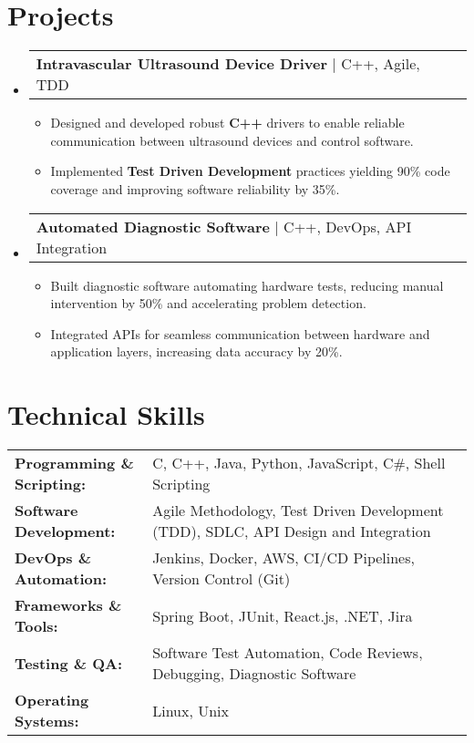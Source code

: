 \documentclass[letterpaper,11pt]{article}
\makeatletter
\newcommand{\resumeItem}[1]{
  \item\footnotesize{
    {#1 \vspace{-2pt}}
  }
}
\newcommand{\resumeProjectHeading}[2]{
    \item
    \begin{tabular*}{1.001\textwidth}{l@{\extracolsep{\fill}}r}
      \small#1 & \textbf{\small #2}\\
    \end{tabular*}\vspace{-7pt}
}
\newcommand{\resumeSubHeadingListStart}{\begin{itemize}[leftmargin=0pt, label={}]}
\newcommand{\resumeSubHeadingListEnd}{\end{itemize}}
\newcommand{\resumeItemListStart}{\begin{itemize}[leftmargin=*]}
\newcommand{\resumeItemListEnd}{\end{itemize}\vspace{-5pt}}
\makeatother
\begin{document}
\section{Projects}
    \vspace{-5pt}
    \resumeSubHeadingListStart
      \resumeProjectHeading
          {\textbf{Intravascular Ultrasound Device Driver} | C++, Agile, TDD}{}
          \resumeItemListStart
              \resumeItem{Designed and developed robust \textbf{C++} drivers to enable reliable communication between ultrasound devices and control software.}
              \resumeItem{Implemented \textbf{Test Driven Development} practices yielding 90\% code coverage and improving software reliability by 35\%.}
          \resumeItemListEnd
          \vspace{-16pt}
      \resumeProjectHeading
          {\textbf{Automated Diagnostic Software} | C++, DevOps, API Integration}{}
          \resumeItemListStart
              \resumeItem{Built diagnostic software automating hardware tests, reducing manual intervention by 50\% and accelerating problem detection.}
              \resumeItem{Integrated APIs for seamless communication between hardware and application layers, increasing data accuracy by 20\%.}
          \resumeItemListEnd
          \vspace{-16pt}
    \resumeSubHeadingListEnd
\vspace{-10pt}
\section{Technical Skills}
        \vspace{-14pt}
        \begin{table}[h]
            \footnotesize
            \begin{tabular}{p{0.3\linewidth} p{0.7\linewidth}}
                \textbf{Programming \& Scripting:} & C, C++, Java, Python, JavaScript, C\#, Shell Scripting \\
                \textbf{Software Development:} & Agile Methodology, Test Driven Development (TDD), SDLC, API Design and Integration \\
                \textbf{DevOps \& Automation:} & Jenkins, Docker, AWS, CI/CD Pipelines, Version Control (Git) \\
                \textbf{Frameworks \& Tools:} & Spring Boot, JUnit, React.js, .NET, Jira \\
                \textbf{Testing \& QA:} & Software Test Automation, Code Reviews, Debugging, Diagnostic Software \\
                \textbf{Operating Systems:} & Linux, Unix \\
            \end{tabular}
        \end{table}
\end{document}
